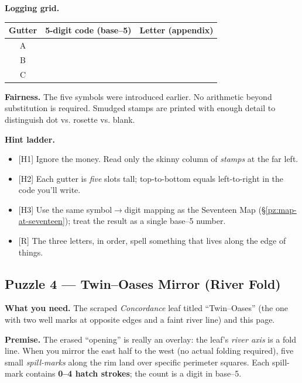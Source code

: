 \documentclass[11pt]{article}
\numberwithin{equation}{section} %
\theoremstyle{plain} %
\theoremstyle{definition} %
\theoremstyle{remark} %
\begin{document}
\medskip
\noindent\textbf{Logging grid.}
\begin{center}
\begin{tabular}{c|c|c}
\textbf{Gutter} & \textbf{5-digit code (base–5)} & \textbf{Letter (appendix)} \\
\hline
A & \hspace{3.5cm} & \hspace{1.2cm} \\
B & \hspace{3.5cm} & \hspace{1.2cm} \\
C & \hspace{3.5cm} & \hspace{1.2cm} \\
\end{tabular}
\end{center}

\medskip
\noindent\textbf{Fairness.} The five symbols were introduced earlier. No arithmetic beyond substitution is required. Smudged stamps are printed with enough detail to distinguish dot vs. rosette vs. blank.

\medskip
\noindent\textbf{Hint ladder.}
\begin{itemize}\setlength\itemsep{0.25em}
  \item \textsc{[H1]} Ignore the money. Read only the skinny column of \emph{stamps} at the far left.
  \item \textsc{[H2]} Each gutter is \emph{five} slots tall; top-to-bottom equals left-to-right in the code you’ll write.
  \item \textsc{[H3]} Use the same symbol\(\rightarrow\)digit mapping as the Seventeen Map (\S\ref{pz:map-at-seventeen}); treat the result as a single base–5 number.
  \item \textsc{[R]} The three letters, in order, spell something that lives along the edge of things.
\end{itemize}

\subsection{Puzzle 4 — Twin–Oases Mirror (River Fold)}
\label{pz:twin-oases}

\noindent\textbf{What you need.} The scraped \emph{Concordance} leaf titled “Twin–Oases” (the one with two well marks at opposite edges and a faint river line) and this page.

\medskip
\noindent\textbf{Premise.} The erased “opening” is really an overlay: the leaf’s \emph{river axis} is a fold line. When you mirror the east half to the west (no actual folding required), five small \emph{spill-marks} along the rim land over specific perimeter squares. Each spill-mark contains \textbf{0–4 hatch strokes}; the count is a digit in base–5.
\end{document}
